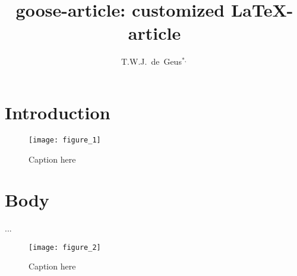 \documentclass{goose-article}
\title{goose-article: customized \LaTeX-article}
\author[1]{T.W.J.~de~Geus$^{*,}$}
\affil[1]{
  Physics Institute, \'{E}cole Polytechnique F\'{e}d\'{e}rale de Lausanne (EPFL) \nl
  Switzerland
}
\begin{document}
\maketitle

\begin{abstract}
\noindent
\lipsum[1]

\end{abstract}

\section{Introduction}
\lipsum[2-4] \citep{Geus10,Geus11,Geus12}

\begin{figure}[htp]
  \centering
  \texttt{[image: figure\_1]}
  \caption{Caption here}
  \label{fig:a}
\end{figure}

\section{Body}
\lipsum[5-10] \citet{Geus13} ...

\begin{figure}[htp]
  \centering
  \texttt{[image: figure\_2]}
  \caption{Caption here}
  \label{fig:b}
\end{figure}


\end{document}
